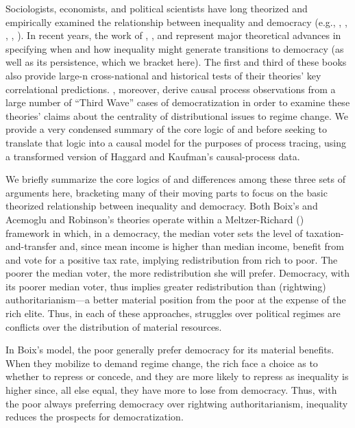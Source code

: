 \documentclass[12pt,]{book}
\begin{document}
Sociologists, economists, and political scientists have long theorized and empirically examined the relationship between inequality and democracy (e.g., \citet{dahl1973polyarchy}, \citet{bollen1985political}, \citet{acemoglu2005economic}, \citet{boix2003democracy}, \citet{ansell2014inequality}). In recent years, the work of \citet{boix2003democracy}, \citet{acemoglu2005economic}, and \citet{ansell2014inequality} represent major theoretical advances in specifying when and how inequality might generate transitions to democracy (as well as its persistence, which we bracket here). The first and third of these books also provide large-n cross-national and historical tests of their theories' key correlational predictions. \citet{haggard2012inequality}, moreover, derive causal process observations from a large number of ``Third Wave'' cases of democratization in order to examine these theories' claims about the centrality of distributional issues to regime change. We provide a very condensed summary of the core logic of \citet{boix2003democracy} and \citet{acemoglu2005economic} before seeking to translate that logic into a causal model for the purposes of process tracing, using a transformed version of Haggard and Kaufman's causal-process data.

We briefly summarize the core logics of and differences among these three sets of arguments here, bracketing many of their moving parts to focus on the basic theorized relationship between inequality and democracy. Both Boix's and Acemoglu and Robinson's theories operate within a Meltzer-Richard (\citet{meltzer1981rational}) framework in which, in a democracy, the median voter sets the level of taxation-and-transfer and, since mean income is higher than median income, benefit from and vote for a positive tax rate, implying redistribution from rich to poor. The poorer the median voter, the more redistribution she will prefer. Democracy, with its poorer median voter, thus implies greater redistribution than (rightwing) authoritarianism---a better material position from the poor at the expense of the rich elite. Thus, in each of these approaches, struggles over political regimes are conflicts over the distribution of material resources.

In Boix's model, the poor generally prefer democracy for its material benefits. When they mobilize to demand regime change, the rich face a choice as to whether to repress or concede, and they are more likely to repress as inequality is higher since, all else equal, they have more to lose from democracy. Thus, with the poor always preferring democracy over rightwing authoritarianism, inequality reduces the prospects for democratization.
\end{document}
